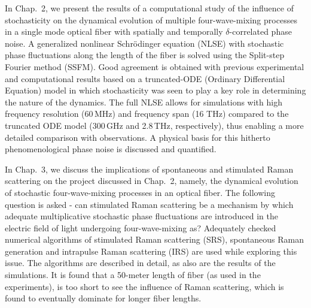In Chap.\ 2, we present the results of a computational study of the
influence of stochasticity on the dynamical evolution of multiple 
four-wave-mixing processes in a single mode optical fiber with spatially
and temporally $\delta$-correlated phase noise. A generalized nonlinear
Schr\"odinger equation (NLSE) with stochastic phase fluctuations along the
length of the fiber is solved using the Split-step Fourier method
(SSFM). Good agreement is obtained with previous experimental and
computational results based on a truncated-ODE (Ordinary Differential
Equation) model in which stochasticity was seen to play a key role in
determining the nature of the dynamics. The full NLSE allows for
simulations with high frequency resolution (60\,MHz) and frequency span (16
THz) compared to the truncated ODE model (300\,GHz and 2.8\,THz,
respectively), thus enabling a more detailed comparison with
observations. A physical basis for this hitherto phenomenological phase
noise is discussed and quantified.

In Chap.\ 3, we discuss the implications of spontaneous and stimulated
Raman scattering on the project discussed in Chap.\ 2, namely, the dynamical evolution of 
stochastic four-wave-mixing processes in an optical fiber.
The following question is asked - can stimulated Raman scattering be a mechanism by which
adequate multiplicative stochastic phase fluctuations are introduced in the 
electric field of light undergoing four-wave-mixing as? Adequately checked numerical
algorithms of stimulated Raman scattering (SRS), spontaneous Raman generation and intrapulse 
Raman scattering (IRS) are used while exploring this issue. The algorithms are described in detail, as also are 
the results of the simulations. It is found that a 50-meter length of fiber (as used in the experiments),
is too short to see the influence of Raman scattering, which is found to eventually 
dominate for longer fiber lengths.

